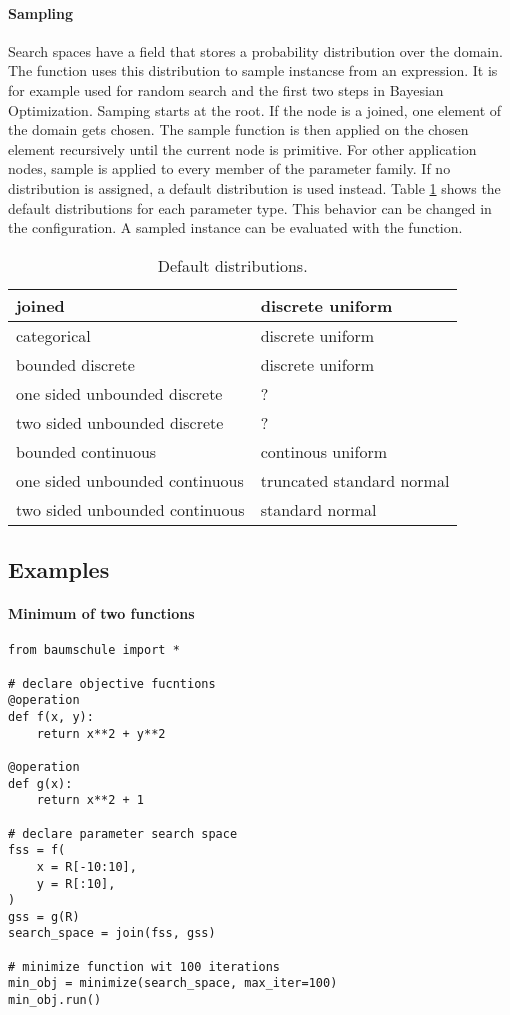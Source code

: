 \documentclass[english]{article}
\begin{document}
\paragraph{Sampling} Search spaces have a  field that stores a probability distribution over the domain. The  function uses this distribution to sample instancse from an expression. It is for example used for random search and the first two steps in Bayesian Optimization. Samping starts at the root. If the node is a joined, one element of the domain gets chosen. The sample function is then applied on the chosen element recursively until the current node is primitive. For other application nodes, sample is applied to every member of the parameter family. If no distribution is assigned, a default distribution is used instead. Table \ref{default dists} shows the default distributions for each parameter type. This behavior can be changed in the configuration. A sampled instance can be evaluated with the  function.

\begin{table}
\centering
\begin{tabular}{|l|l|}
\hline joined & discrete uniform \\
\hline categorical & discrete uniform \\
\hline bounded discrete & discrete uniform \\
\hline one sided unbounded discrete & ? \\
\hline two sided unbounded discrete & ? \\
\hline bounded continuous & continous uniform \\
\hline one sided unbounded continuous & truncated standard normal \\
\hline two sided unbounded continuous & standard normal \\
\hline
\end{tabular}
\caption{Default distributions.}
\label{default dists}
\end{table}


\subsection{Examples}

\paragraph{Minimum of two functions}
\begin{verbatim}
from baumschule import *

# declare objective fucntions
@operation
def f(x, y):
    return x**2 + y**2

@operation
def g(x):
    return x**2 + 1

# declare parameter search space
fss = f(
    x = R[-10:10],
    y = R[:10],
)
gss = g(R)
search_space = join(fss, gss)

# minimize function wit 100 iterations
min_obj = minimize(search_space, max_iter=100)
min_obj.run()

\end{verbatim}
\end{document}
